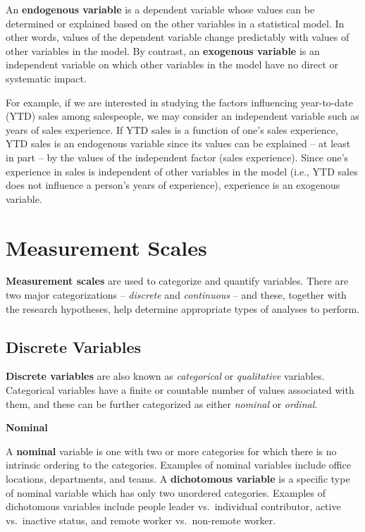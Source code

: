 \documentclass[
]{book}
\begin{document}
An \textbf{endogenous variable} is a dependent variable whose values can be determined or explained based on the other variables in a statistical model. In other words, values of the dependent variable change predictably with values of other variables in the model. By contrast, an \textbf{exogenous variable} is an independent variable on which other variables in the model have no direct or systematic impact.

For example, if we are interested in studying the factors influencing year-to-date (YTD) sales among salespeople, we may consider an independent variable such as years of sales experience. If YTD sales is a function of one's sales experience, YTD sales is an endogenous variable since its values can be explained -- at least in part -- by the values of the independent factor (sales experience). Since one's experience in sales is independent of other variables in the model (i.e., YTD sales does not influence a person's years of experience), experience is an exogenous variable.

\hypertarget{measurement-scales}{%
\section{Measurement Scales}\label{measurement-scales}}

\textbf{Measurement scales} are used to categorize and quantify variables. There are two major categorizations -- \emph{discrete} and \emph{continuous} -- and these, together with the research hypotheses, help determine appropriate types of analyses to perform.

\hypertarget{discrete-variables}{%
\subsection{Discrete Variables}\label{discrete-variables}}

\textbf{Discrete variables} are also known as \emph{categorical} or \emph{qualitative} variables. Categorical variables have a finite or countable number of values associated with them, and these can be further categorized as either \emph{nominal} or \emph{ordinal}.

\textbf{Nominal}

A \textbf{nominal} variable is one with two or more categories for which there is no intrinsic ordering to the categories. Examples of nominal variables include office locations, departments, and teams. A \textbf{dichotomous variable} is a specific type of nominal variable which has only two unordered categories. Examples of dichotomous variables include people leader vs.~individual contributor, active vs.~inactive status, and remote worker vs.~non-remote worker.
\end{document}
